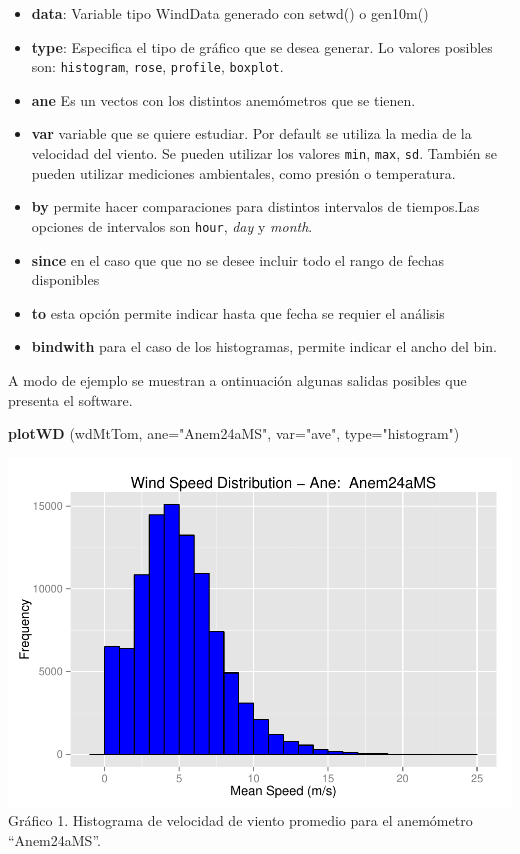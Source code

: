 \documentclass[]{article}
\newenvironment{Shaded}{\begin{snugshade}}{\end{snugshade}}
\newcommand{\KeywordTok}[1]{\textcolor[rgb]{0.13,0.29,0.53}{\textbf{{#1}}}}
\newcommand{\DataTypeTok}[1]{\textcolor[rgb]{0.13,0.29,0.53}{{#1}}}
\newcommand{\StringTok}[1]{\textcolor[rgb]{0.31,0.60,0.02}{{#1}}}
\newcommand{\NormalTok}[1]{{#1}}
\begin{document}
\begin{itemize}
\itemsep1pt\parskip0pt
\item
  \textbf{data}: Variable tipo WindData generado con setwd() o gen10m()
\item
  \textbf{type}: Especifica el tipo de gráfico que se desea generar. Lo
  valores posibles son: \texttt{histogram}, \texttt{rose},
  \texttt{profile}, \texttt{boxplot}.
\item
  \textbf{ane} Es un vectos con los distintos anemómetros que se tienen.
\item
  \textbf{var} variable que se quiere estudiar. Por default se utiliza
  la media de la velocidad del viento. Se pueden utilizar los valores
  \texttt{min}, \texttt{max}, \texttt{sd}. También se pueden utilizar
  mediciones ambientales, como presión o temperatura.
\item
  \textbf{by} permite hacer comparaciones para distintos intervalos de
  tiempos.Las opciones de intervalos son \texttt{hour}, \emph{day} y
  \emph{month}.
\item
  \textbf{since} en el caso que que no se desee incluir todo el rango de
  fechas disponibles
\item
  \textbf{to} esta opción permite indicar hasta que fecha se requier el
  análisis
\item
  \textbf{bindwith} para el caso de los histogramas, permite indicar el
  ancho del bin.
\end{itemize}

A modo de ejemplo se muestran a ontinuación algunas salidas posibles que
presenta el software.

\begin{Shaded}
\begin{Highlighting}[]
\KeywordTok{plotWD} \NormalTok{(wdMtTom, }\DataTypeTok{ane=}\StringTok{"Anem24aMS"}\NormalTok{, }\DataTypeTok{var=}\StringTok{"ave"}\NormalTok{, }\DataTypeTok{type=}\StringTok{"histogram"}\NormalTok{)}
\end{Highlighting}
\end{Shaded}

\includegraphics{Manual_WindResource_files/figure-latex/unnamed-chunk-9-1.pdf}
Gráfico 1. Histograma de velocidad de viento promedio para el anemómetro
``Anem24aMS''.
\end{document}

